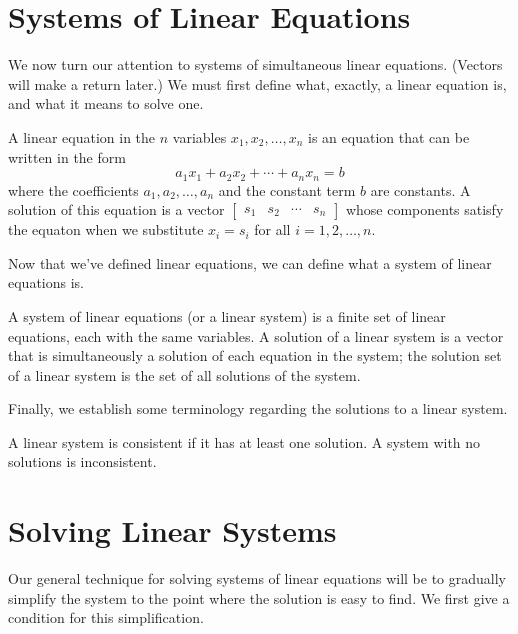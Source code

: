 \documentclass[../m73main.tex]{subfiles}
\begin{document}
\section{Systems of Linear Equations}
We now turn our attention to systems of simultaneous linear equations.
(Vectors will make a return later.)
We must first define what, exactly, a linear equation is, and what it means to solve one.

\begin{definition}
	A linear equation in the $n$ variables $x_1, x_2, \ldots, x_n$ is an equation that can be written in the form
	\[ a_1 x_1 + a_2 x_2 + \cdots + a_n x_n = b \]
	where the coefficients $a_1, a_2, \ldots, a_n$ and the constant term $b$ are constants.
	A solution of this equation is a vector $\begin{bmatrix} s_1 & s_2 & \cdots & s_n \end{bmatrix}$ whose components satisfy the equaton when we substitute $x_i = s_i$ for all $i = 1, 2, \ldots, n$.
\end{definition}

Now that we've defined linear equations, we can define what a system of linear equations is.

\begin{definition}
	A system of linear equations (or a linear system) is a finite set of linear equations, each with the same variables.
	A solution of a linear system is a vector that is simultaneously a solution of each equation in the system; the solution set of a linear system is the set of all solutions of the system.
\end{definition}

Finally, we establish some terminology regarding the solutions to a linear system.

\begin{definition}
	A linear system is consistent if it has at least one solution.
	A system with no solutions is inconsistent.
\end{definition}

\section{Solving Linear Systems}
Our general technique for solving systems of linear equations will be to gradually simplify the system to the point where the solution is easy to find.
We first give a condition for this simplification.
\end{document}
